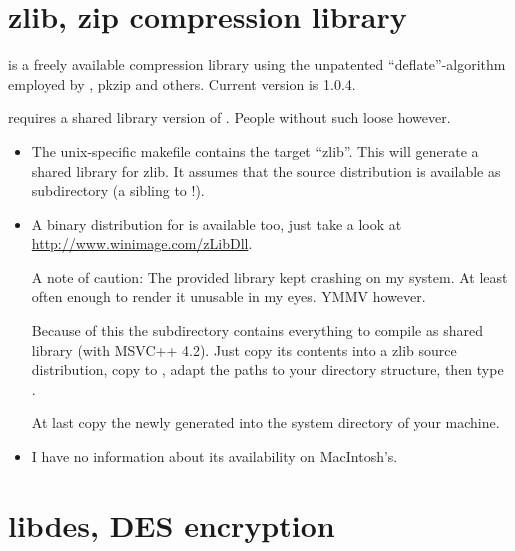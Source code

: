 \documentclass {report}
\begin{document}
\chapter {zlib, zip compression library}\label{zlib}

\zlib{} is a freely available compression library using the
unpatented ``deflate''-algorithm employed by , \cmd
{pkzip} and others. Current version is 1.0.4.

\trf{} requires a shared library version of \zlib. People
without such  loose however.

\begin {itemize}
\item	The unix-specific makefile contains the target ``zlib''. This
	will generate a shared library for zlib. It assumes that the
	 source distribution is available as subdirectory
	 (a sibling to  !).

\item	A binary distribution for \win{} is available too, just take a
	look at
	\url{http://www.winimage.com/zLibDll}. 

	A note of caution: The provided library kept crashing on my
	\winnt{} system. At least often enough to render it unusable in
	my eyes. YMMV however.

	Because of this the subdirectory  contains
	everything to compile \zlib{} as shared library (with MSVC++
	4.2). Just copy its contents into a zlib source distribution,
	copy  to , adapt the paths
	to your directory structure, then type .

	At last copy the newly generated  into the
	system directory of your machine.

\item	I have no information about its availability on MacIntosh's.
\end   {itemize}



\chapter {libdes, DES encryption}\label {libdes}
\end{document}
